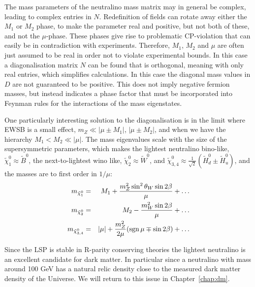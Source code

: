 \documentclass[notes.tex]{subfiles}
\begin{document}
The mass parameters of the neutralino mass matrix may in general be complex, leading to complex entries in $N$. Redefinition of fields can rotate away either the $M_1$ or $M_2$ phase, to make the parameter real and positive, but not both of these, and not the $\mu$-phase. These phases give rise to problematic CP-violation that can easily be in contradiction with experiments. Therefore, $M_1$, $M_2$ and $\mu$ are often just assumed to be real in order not to violate experimental bounds. In this case a diagonalisation matrix $N$ can be found that is orthogonal, meaning with only real entries, which simplifies calculations. In this case the diagonal mass values in $D$ are not guaranteed to be positive. This does not imply negative fermion masses, but instead indicates a phase factor that must be incorporated into Feynman rules for the interactions of the mass eigenstates.

One particularly interesting solution to the diagonalisation is in the limit where EWSB is a small effect, $m_Z\ll |\mu \pm M_1|$, $|\mu \pm M_2|$, and when we have the hierarchy $M_1<M_2\ll |\mu|$. The mass eigenvalues scale with the size of the supersymmetric parameters, which makes the lightest neutralino bino-like, $\tilde{\chi}_1^0\approx \tilde{B}^0$, the next-to-lightest wino like, $\tilde{\chi}_2^0\approx \tilde{W}^0$, and $\tilde{\chi}^0_{3,4} \approx \frac{1}{\sqrt{2}}(\tilde{H}^0_d \pm \tilde{H}^0_u)$, and the masses are to first order in $1/\mu$:
\begin{eqnarray}
m_{\tilde{\chi}^0_1} &=& M_1 +\frac{m_Z^2\sin^2\theta_W\sin2\beta}{\mu} +\ldots\\
m_{\tilde{\chi}^0_2} &=& M_2 -\frac{m_W^2\sin2\beta}{\mu} +\ldots\\
m_{\tilde{\chi}^0_{3,4}} &=& |\mu| +\frac{m_Z^2}{2\mu}({\rm sgn}\,\mu \mp \sin2\beta) + \ldots
\end{eqnarray}

Since the LSP is stable in R-parity conserving theories the lightest neutralino is an excellent candidate for dark matter. In particular since a neutralino with mass around 100 GeV has a natural relic density close to the measured dark matter density of the Universe. We will return to this issue in Chapter~\ref{chap:dm}.
\end{document}
